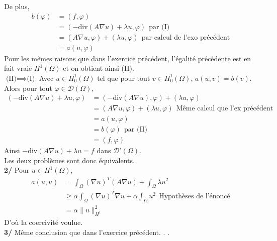 \documentclass[a4paper,12pt]{article}
\newcommand{\Ho}{H^1_0(\Omega)}
\begin{document}
De plus, 
\begin{align*}
b(\varphi) & = (f, \varphi) \\
&= (- \text{div} (A \nabla u) + \lambda u, \varphi) \ \ \text{par (I)} \\
&= (A \nabla u, \varphi) + (\lambda u, \varphi) \ \ \text{par calcul de l'exo précédent} \\
& \boxed{= a(u, \varphi)}
\end{align*}
Pour les mêmes raisons que dans l'exercice précédent, l'égalité précédente est en fait vraie $H^1(\Omega)$ et on obtient ainsi (II). \\

$\boxed{\text{(II)} \implies \text{(I)}}$ Avec $u \in \Ho$ tel que pour tout $v \in \Ho$, $a(u,v)=b(v)$. Alors pour tout $\varphi \in \mathcal{D}(\Omega)$,
\begin{align*}
(-\text{div}(A \nabla u)+ \lambda u, \varphi) &= (-\text{div}(A \nabla u), \varphi) + (\lambda u, \varphi) \\
&= (A \nabla u, \varphi) + (\lambda u, \varphi) \ \ \text{Même calcul que l'ex précédent} \\
&= a(u,\varphi) \\
&= b(\varphi) \ \ \text{par (II)} \\
& \boxed{=(f, \varphi)}
\end{align*}
Ainsi $\boxed{-\text{div}(A \nabla u)+ \lambda u = f}$ dans $\mathcal{D}'(\Omega)$. \\

Les deux problèmes sont donc équivalents. \\

\textbf{2/} Pour $u \in H^1(\Omega)$,
\begin{align*}
a(u,u) & = \int_{\Omega} (\nabla u)^T (A \nabla u) + \int_{\Omega} \lambda u^2 \\
& \geq  \alpha \int_{\Omega} (\nabla u)^T \nabla u + \alpha \int_{\Omega} u^2 \ \ \text{Hypothèses de l'énoncé} \\
& \boxed{= \alpha \|u\|_{H^1}^2}
\end{align*}
D'où la coercivité voulue. \\

\textbf{3/} Même conclusion que dans l'exercice précédent. . .
\end{document}
